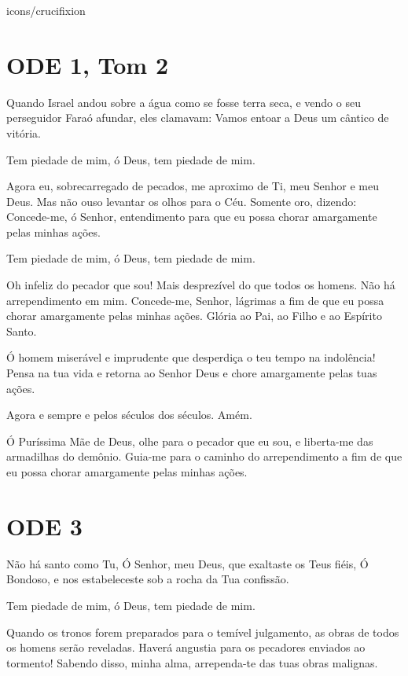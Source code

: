 \documentclass{subfiles}
\begin{document}
\begin{chapterimg}[height=\textheight]{icons/crucifixion}
\end{chapterimg}

\section*{ODE 1, Tom 2}

\eirmos{}Quando Israel andou sobre a água como se fosse terra seca, e vendo o seu
perseguidor Faraó afundar, eles clamavam: Vamos entoar a Deus um cântico de
vitória.

Tem piedade de mim, ó Deus, tem piedade de mim.

Agora eu, sobrecarregado de pecados, me aproximo de Ti, meu Senhor e meu Deus.
Mas não ouso levantar os olhos para o Céu. Somente oro, dizendo: Concede-me, ó
Senhor, entendimento para que eu possa chorar amargamente pelas minhas ações.

Tem piedade de mim, ó Deus, tem piedade de mim.

Oh infeliz do pecador que sou! Mais desprezível do que todos os homens. Não há
arrependimento em mim. Concede-me, Senhor, lágrimas a fim de que eu possa chorar
amargamente pelas minhas ações. Glória ao Pai, ao Filho e ao Espírito Santo.

Ó homem miserável e imprudente que desperdiça o teu tempo na
indolência! Pensa na tua vida e retorna ao Senhor Deus e chore amargamente
pelas tuas ações.

Agora e sempre e pelos séculos dos séculos. Amém.

\theotokion{}Ó Puríssima Mãe de Deus, olhe para o pecador que eu sou, e
liberta-me das armadilhas do demônio. Guia-me para o caminho do arrependimento a
fim de que eu possa chorar amargamente pelas minhas ações.

\section*{ODE 3}

\eirmos{}Não há santo como Tu, Ó Senhor, meu Deus, que exaltaste os Teus fiéis,
Ó Bondoso, e nos estabeleceste sob a rocha da Tua confissão.

Tem piedade de mim, ó Deus, tem piedade de mim.

Quando os tronos forem preparados para o temível julgamento, as obras de todos
os homens serão reveladas. Haverá angustia para os pecadores enviados ao
tormento! Sabendo disso, minha alma, arrependa-te das tuas obras malignas.
\end{document}
